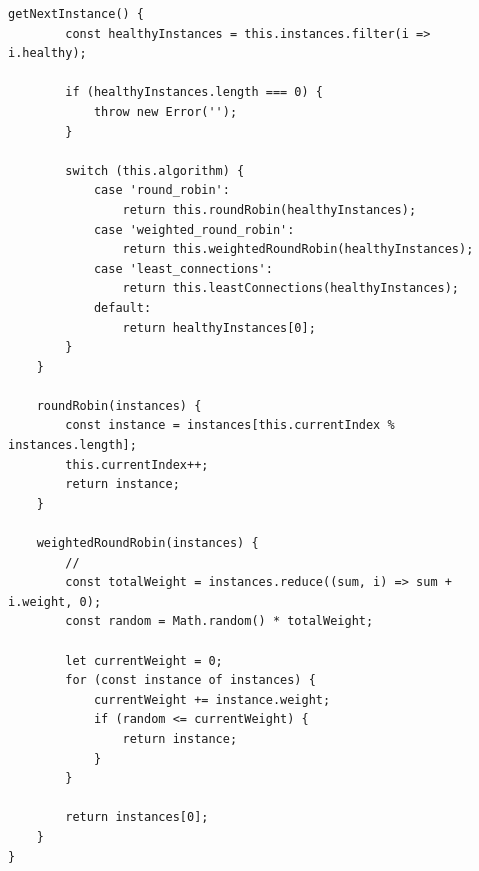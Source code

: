 \begin{lstlisting}[style=javascript]
    getNextInstance() {
        const healthyInstances = this.instances.filter(i => i.healthy);
        
        if (healthyInstances.length === 0) {
            throw new Error('');
        }
        
        switch (this.algorithm) {
            case 'round_robin':
                return this.roundRobin(healthyInstances);
            case 'weighted_round_robin':
                return this.weightedRoundRobin(healthyInstances);
            case 'least_connections':
                return this.leastConnections(healthyInstances);
            default:
                return healthyInstances[0];
        }
    }
    
    roundRobin(instances) {
        const instance = instances[this.currentIndex % instances.length];
        this.currentIndex++;
        return instance;
    }
    
    weightedRoundRobin(instances) {
        // 
        const totalWeight = instances.reduce((sum, i) => sum + i.weight, 0);
        const random = Math.random() * totalWeight;
        
        let currentWeight = 0;
        for (const instance of instances) {
            currentWeight += instance.weight;
            if (random <= currentWeight) {
                return instance;
            }
        }
        
        return instances[0];
    }
}
\end{lstlisting}

\hypertarget{section-121}{%
\subsubsection{}\label{section-121}}

